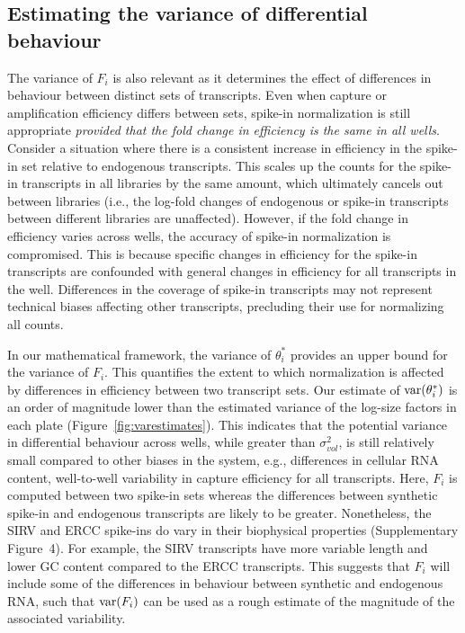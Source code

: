 \documentclass{article}
\newcommand{\suppfigbiophys}{4}
\begin{document}
\subsection{Estimating the variance of differential behaviour}
The variance of $F_i$ is also relevant as it determines the effect of differences in behaviour between distinct sets of transcripts.
Even when capture or amplification efficiency differs between sets, spike-in normalization is still appropriate \textit{provided that the fold change in efficiency is the same in all wells}.
Consider a situation where there is a consistent increase in efficiency in the spike-in set relative to endogenous transcripts.
This scales up the counts for the spike-in transcripts in all libraries by the same amount, which ultimately cancels out between libraries (i.e., the log-fold changes of endogenous or spike-in transcripts between different libraries are unaffected).
However, if the fold change in efficiency varies across wells, the accuracy of spike-in normalization is compromised.
This is because specific changes in efficiency for the spike-in transcripts are confounded with general changes in efficiency for all transcripts in the well.
Differences in the coverage of spike-in transcripts may not represent technical biases affecting other transcripts, precluding their use for normalizing all counts.

In our mathematical framework, the variance of $\theta^*_i$ provides an upper bound for the variance of $F_i$.
This quantifies the extent to which normalization is affected by differences in efficiency between two transcript sets.
Our estimate of $\mbox{var}(\theta^*_i)$ is an order of magnitude lower than the estimated variance of the log-size factors in each plate (Figure~\ref{fig:varestimates}).
This indicates that the potential variance in differential behaviour across wells, while greater than $\sigma^2_{vol}$, is still relatively small compared to other biases in the system, e.g., differences in cellular RNA content, well-to-well variability in capture efficiency for all transcripts.
Here, $F_i$ is computed between two spike-in sets whereas the differences between synthetic spike-in and endogenous transcripts are likely to be greater.
Nonetheless, the SIRV and ERCC spike-ins do vary in their biophysical properties (Supplementary Figure~\suppfigbiophys{}).
For example, the SIRV transcripts have more variable length and lower GC content compared to the ERCC transcripts.
This suggests that $F_i$ will include some of the differences in behaviour between synthetic and endogenous RNA, such that $\mbox{var}(F_i)$ can be used as a rough estimate of the magnitude of the associated variability.
\end{document}
